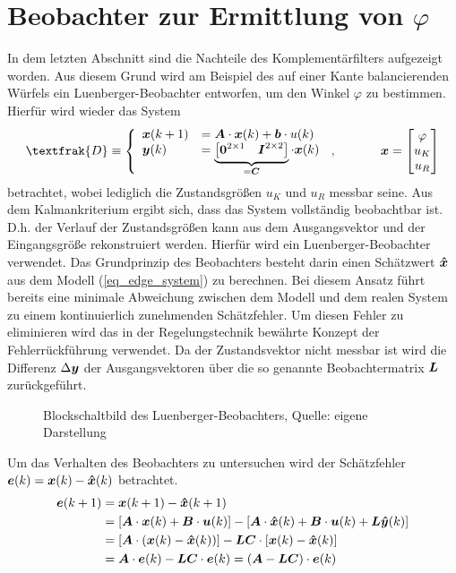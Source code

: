 \section{Beobachter zur Ermittlung von $\varphi$}
In dem letzten Abschnitt sind die Nachteile des Komplementärfilters aufgezeigt worden. Aus diesem Grund wird am Beispiel des auf einer Kante balancierenden Würfels ein Luenberger-Beobachter entworfen, um den Winkel $\varphi$ zu bestimmen. Hierfür wird wieder das System
\begin{equation}
\textfrak{D} \equiv \left\{ \begin{array}{ll}
\bs{x}(k+1) &= \bs{A}\cdot \bs{x}(k) + \bs{b}\cdot u(k)
\\
\bs{y}(k) &= \underbrace{\begin{bmatrix}
\bs{0}^{2\times 1} & \bs{I}^{2\times 2}
\end{bmatrix}}_{= \bs{C}} \cdot \bs{x}(k)
\end{array}\right.\,, \hspace{35pt} \bs{x}=\begin{bmatrix}
\varphi \\ u_K \\ u_R
\end{bmatrix}
\label{eq_edge_system}
\end{equation}
betrachtet, wobei lediglich die Zustandsgrößen $u_K$ und $u_R$ messbar seine. Aus dem Kalmankriterium ergibt sich, dass das System vollständig beobachtbar ist. D.h. der Verlauf der Zustandsgrößen kann aus dem Ausgangsvektor und der Eingangsgröße rekonstruiert werden. Hierfür wird ein Luenberger-Beobachter verwendet. Das Grundprinzip des Beobachters besteht darin einen Schätzwert $\boldsymbol{\hat{x}}$ aus dem Modell (\ref{eq_edge_system}) zu berechnen. Bei diesem Ansatz führt bereits eine minimale Abweichung zwischen dem Modell und dem realen System zu einem kontinuierlich zunehmenden Schätzfehler. Um diesen Fehler zu eliminieren wird das in der Regelungstechnik bewährte Konzept der Fehlerrückführung verwendet. Da der Zustandsvektor nicht messbar ist wird  die Differenz $\Delta \boldsymbol{y}$ der Ausgangsvektoren über die so genannte Beobachtermatrix $\boldsymbol{L}$ zurückgeführt.
\begin{figure}

\caption{Blockschaltbild des Luenberger-Beobachters, Quelle: eigene Darstellung}
\end{figure}
Um das Verhalten des Beobachters zu untersuchen wird der Schätzfehler $\boldsymbol{e}(k) = \boldsymbol{x}(k) - \boldsymbol{\hat{x}}(k)$ betrachtet.
\begin{equation}
\begin{split}
\boldsymbol{e}(k+1) &= \boldsymbol{x}(k+1) - \boldsymbol{\hat{x}}(k+1) \\
&= [\boldsymbol{A}\cdot \boldsymbol{x}(k) + \boldsymbol{B}\cdot \boldsymbol{u}(k)] - [\boldsymbol{A}\cdot \boldsymbol{\hat{x}}(k) + \boldsymbol{B}\cdot \boldsymbol{u}(k) +\boldsymbol{L}\boldsymbol{\hat{y}}(k)]
\\
&= [\boldsymbol{A}\cdot (\boldsymbol{x}(k) - \boldsymbol{\hat{x}}(k))] - \boldsymbol{L}\boldsymbol{C}\cdot[\boldsymbol{x}(k)-\boldsymbol{\hat{x}}(k)] 
\\
&= \boldsymbol{A}\cdot \boldsymbol{e}(k) - \boldsymbol{LC}\cdot\boldsymbol{e}(k) = (\boldsymbol{A}-\boldsymbol{LC})\cdot \boldsymbol{e}(k)
\end{split}
\end{equation}
